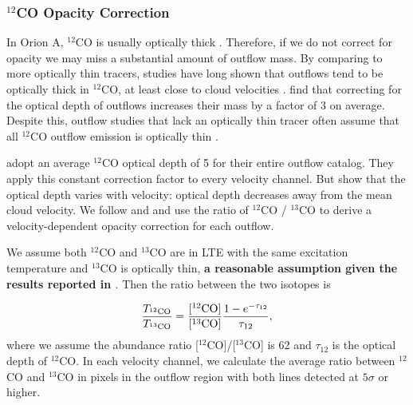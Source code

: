 \documentclass[twocolumn]{aastex63}
\newcommand{\co}[1][]{\ensuremath{^{#1}}CO}
\begin{document}
\subsubsection{$^{12}$CO Opacity Correction}\label{sec:opacity}
In Orion A, \co[12]{} is usually optically thick \citep{Kong18}. Therefore, if we do not correct for opacity we may miss a substantial amount of outflow mass. By comparing to more optically thin tracers, studies have long shown that outflows tend to be optically thick in \co[12]{}, at least close to cloud velocities \citep[e.g.,][]{Goldsmith84,Arce01}. \citet{Dunham14} find that correcting for the optical depth of outflows increases their mass by a factor of 3 on average. Despite this, outflow studies that lack an optically thin tracer often assume that all \co[12]{} outflow emission is optically thin \citep[e.g. in Orion,][]{Morgan91,Takahashi08}. 

\citet{Tanabe19} adopt an average \co[12]{} optical depth of 5 for their entire outflow catalog. They apply this constant correction factor to every velocity channel. But \citet{Dunham14} show that the optical depth varies with velocity: optical depth decreases away from the mean cloud velocity. We follow \citet{Dunham14} and \citet{ZhangY16} and use the ratio of $^{12}$CO / $^{13}$CO to derive a velocity-dependent opacity correction for each outflow.

We assume both \co[12]{} and \co[13]{} are in LTE with the same excitation temperature and \co[13]{} is optically thin, \textbf{a reasonable assumption given the results reported in \citet{Kong18}}. Then the ratio between the two isotopes is

\begin{equation}\label{eq:Tratio}
\frac{T_{\rm \co[12]}}{T_{\rm \co[13]}} = \frac{[\rm{\co[12]}]}{[\rm{\co[13]}]} \frac{1 - e^{-\tau_{12}}}{\tau_{12}},
\end{equation}
where we assume the abundance ratio [\co[12]]/[\co[13]] is 62 \citep{Langer93} and $\tau_{12}$ is the optical depth of \co[12]{}. In each velocity channel, we calculate the average ratio between \co[12]{} and \co[13]{} in pixels in the outflow region with both lines detected at $5\sigma$ or higher. 
\end{document}
